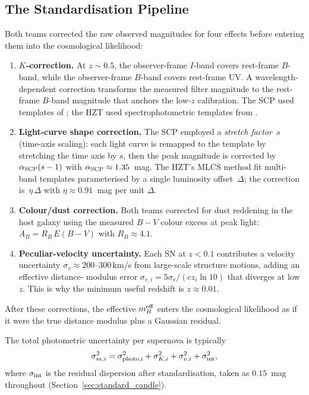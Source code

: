\documentclass[12pt]{article}
\begin{document}
\subsection{The Standardisation Pipeline}

Both teams corrected the raw observed magnitudes for four effects
before entering them into the cosmological likelihood:

\begin{enumerate}
  \item \textbf{$K$-correction.}  At $z \sim 0.5$, the observer-frame
    $I$-band covers rest-frame $B$-band, while the observer-frame
    $B$-band covers rest-frame UV.  A wavelength-dependent correction
    transforms the measured filter magnitude to the rest-frame $B$-band
    magnitude that anchors the low-$z$ calibration.  The SCP used
    templates of \citet{Kim1996}; the HZT used spectrophotometric
    templates from \citet{Nugent2002}.

  \item \textbf{Light-curve shape correction.}  The SCP employed a
    \emph{stretch factor}~$s$ (time-axis scaling): each light curve is
    remapped to the template by stretching the time axis by $s$, then
    the peak magnitude is corrected by $\alpha_{\rm SCP}(s-1)$ with
    $\alpha_{\rm SCP}\approx 1.35$~mag.  The HZT's MLCS method fit
    multi-band templates parameterised by a single luminosity
    offset~$\Delta$; the correction is~$\eta\,\Delta$ with
    $\eta \approx 0.91$~mag per unit $\Delta$.

  \item \textbf{Colour/dust correction.}  Both teams corrected for
    dust reddening in the host galaxy using the measured $B-V$ colour
    excess at peak light: $A_B = R_B\,E(B{-}V)$ with
    $R_B \approx 4.1$.

  \item \textbf{Peculiar-velocity uncertainty.}  Each SN at $z < 0.1$
    contributes a velocity uncertainty $\sigma_v \approx 200$--$300$\,km/s
    from large-scale structure motions, adding an effective distance-
    modulus error $\sigma_{v,i} = 5\sigma_v/(cz_i \ln 10)$ that diverges
    at low $z$.  This is why the minimum useful redshift is $z \approx 0.01$.
\end{enumerate}
After these corrections, the effective $m_B^{\rm eff}$ enters the
cosmological likelihood as if it were the true distance modulus plus a
Gaussian residual.

The total photometric uncertainty per supernova is typically
\[
  \sigma_{m,i}^2 = \sigma_{\rm photo,i}^2
    + \sigma_{K,i}^2 + \sigma_{v,i}^2 + \sigma_{\rm int}^2,
\]
where $\sigma_{\rm int}$ is the residual dispersion after standardisation,
taken as $0.15$~mag throughout (Section~\ref{sec:standard_candle}).
\end{document}
